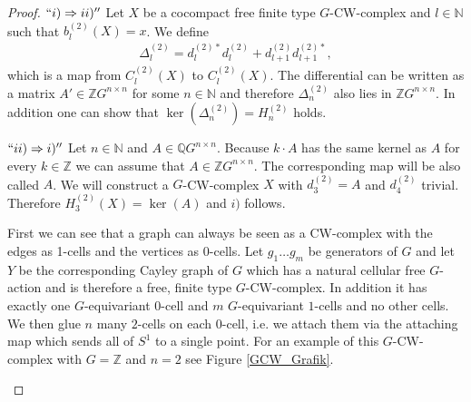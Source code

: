 \documentclass[12pt,a4paper]{scrartcl}
\theoremstyle{plain}
\theoremstyle{definition}
\newcommand{\Q}{\mathbb{Q}} %
\newcommand{\Z}{\mathbb{Z}} %
\newcommand{\N}{\mathbb{N}} %
\newcommand{\2}{\mathbb{Z} / 2 \mathbb{Z}}
\newcommand{\1}{\bar{1}}
\newcommand{\0}{\bar{0}}
\begin{document}
\begin{proof}
	$``i) \Rightarrow ii)''$ Let $X$ be a cocompact free finite type $G$-CW-complex and $l \in \N$ such that $b_l^{(2)}(X)=x$. We define 
	\begin{align*}
		\Delta_l^{(2)} = d_l^{(2)*} d_l^{(2)} + d_{l+1}^{(2)} d_{l+1}^{(2)*},
	\end{align*}
	which is a map from $C_l^{(2)}(X)$ to $C_l^{(2)}(X)$. The differential can be written as a matrix $A' \in \Z G^{n \times n}$ for some $n \in \N$ and therefore $\Delta_n^{(2)}$ also lies in $\Z G^{n \times n}$. In addition one can show that $\ker(\Delta_n^{(2)}) = H_n^{(2)}$ holds.
	
	$``ii) \Rightarrow i)''$ Let $n \in \N$ and $A\in \Q G^{n \times n}$. Because $k \cdot A$ has the same kernel as $A$ for every $k \in \Z$ we can assume that $A \in \Z G^{n \times n}$. The corresponding map will be also called $A$. We will construct a $G$-CW-complex $X$ with $d_3^{(2)} = A$ and $d_4^{(2)}$ trivial. Therefore $H_3^{(2)}(X) = \ker(A)$ and $i)$ follows.
	
	First we can see that a graph can always be seen as a CW-complex with the edges as 1-cells and the vertices as 0-cells. Let $g_1 \ldots g_m$ be generators of $G$ and let $Y$ be the corresponding Cayley graph of $G$ which has a natural cellular free $G$-action and is therefore a free, finite type $G$-CW-complex. In addition it has exactly one $G$-equivariant $0$-cell and $m$ $G$-equivariant $1$-cells and no other cells. We then glue $n$ many $2$-cells on each $0$-cell, i.e. we attach them via the attaching map which sends all of $S^1$ to a single point. For an example of this $G$-CW-complex with $G = \Z$ and $n = 2$ see Figure \ref{GCW_Grafik}.
	\begin{figure}[H]
		\centering
\end{figure}
\end{proof}
\end{document}
